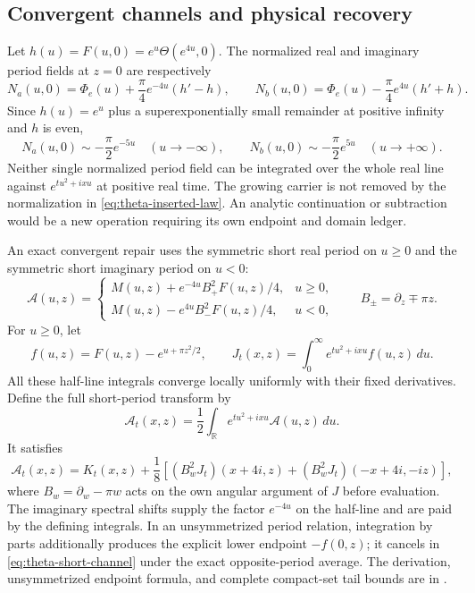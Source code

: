 \documentclass[11pt]{article}
\numberwithin{equation}{section}
\theoremstyle{definition}
\theoremstyle{remark}
\begin{document}
\subsection{Convergent channels and physical recovery}
\label{sec:theta-recovery}

Let $h(u)=F(u,0)=e^u\Theta(e^{4u},0)$.  The normalized real and
imaginary period fields at $z=0$ are respectively
\[
 N_a(u,0)=\Phi_e(u)+\frac\pi4e^{-4u}(h'-h),\qquad
 N_b(u,0)=\Phi_e(u)-\frac\pi4e^{4u}(h'+h).
\]
Since $h(u)=e^u$ plus a superexponentially small remainder at positive
infinity and $h$ is even,
\[
 N_a(u,0)\sim-\frac\pi2e^{-5u}\quad(u\to-\infty),
 \qquad
 N_b(u,0)\sim-\frac\pi2e^{5u}\quad(u\to+\infty).
\]
Neither single normalized period field can be integrated over the
whole real line against $e^{tu^2+ixu}$ at positive real time.  The
growing carrier is not removed by the normalization in
\eqref{eq:theta-inserted-law}.  An analytic continuation or subtraction
would be a new operation requiring its own endpoint and domain ledger.

An exact convergent repair uses the symmetric short real period on
$u\ge0$ and the symmetric short imaginary period on $u<0$:
\begin{equation}
 \mathcal A(u,z)=
 \begin{cases}
 M(u,z)+e^{-4u}B_+^2F(u,z)/4,&u\ge0,\\
 M(u,z)-e^{4u}B_-^2F(u,z)/4,&u<0,
 \end{cases}
 \qquad B_\pm=\partial_z\mp\pi z.
 \label{eq:theta-short-field}
\end{equation}
For $u\ge0$, let
\[
 f(u,z)=F(u,z)-e^{u+\pi z^2/2},\qquad
 J_t(x,z)=\int_0^\infty e^{tu^2+ixu}f(u,z)\,du.
\]
All these half-line integrals converge locally uniformly with their
fixed derivatives. Define the full short-period transform by
\[
 \mathscr A_t(x,z)=\frac12\int_{\mathbb R}
       e^{tu^2+ixu}\mathcal A(u,z)\,du.
\]
It satisfies
\begin{equation}
 \mathscr A_t(x,z)=K_t(x,z)+\frac18
 \left[(B_w^2J_t)(x+4i,z)
              +(B_w^2J_t)(-x+4i,-iz)\right],
 \label{eq:theta-short-channel}
\end{equation}
where $B_w=\partial_w-\pi w$ acts on the own angular argument of $J$
before evaluation.  The imaginary spectral shifts supply the factor
$e^{-4u}$ on the half-line and are paid by the defining integrals.
In an unsymmetrized period relation, integration by parts additionally
produces the explicit lower endpoint $-f(0,z)$; it cancels in
\eqref{eq:theta-short-channel} under the exact opposite-period average.
The derivation, unsymmetrized endpoint formula, and complete compact-set
tail bounds are in \cite{ellipticnote}.
\end{document}
